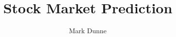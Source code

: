 \documentclass{article}
\title{Stock Market Prediction}
\author{Mark Dunne}
\begin{document}
\date{}
\maketitle
\end{document}
